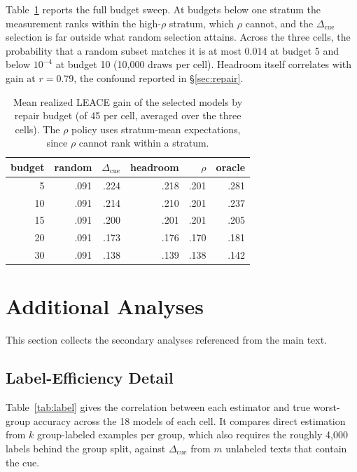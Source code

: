 \documentclass[11pt]{article}
\newcommand{\cued}{\ensuremath{\Delta_{\mathrm{cue}}}}
\begin{document}
Table~\ref{tab:sweep} reports the full budget sweep. At budgets below one
stratum the measurement ranks within the high-$\rho$ stratum, which $\rho$
cannot, and the \cued{} selection is far outside what random selection
attains. Across the three cells, the probability that a random subset matches
it is at most $0.014$ at budget 5 and below $10^{-4}$ at budget 10 (10{,}000
draws per cell). Headroom itself correlates with gain at $r{=}0.79$, the
confound reported in \S\ref{sec:repair}.

\begin{table}[t]
\centering\small
\begin{tabular}{rrrrrr}
\toprule
budget & random & \cued{} & headroom & $\rho$ & oracle \\
\midrule
 5 & .091 & .224 & .218 & .201 & .281 \\
10 & .091 & .214 & .210 & .201 & .237 \\
15 & .091 & .200 & .201 & .201 & .205 \\
20 & .091 & .173 & .176 & .170 & .181 \\
30 & .091 & .138 & .139 & .138 & .142 \\
\bottomrule
\end{tabular}
\caption{Mean realized LEACE gain of the selected models by repair budget
(of 45 per cell, averaged over the three cells). The $\rho$ policy uses
stratum-mean expectations, since $\rho$ cannot rank within a stratum.}
\label{tab:sweep}
\end{table}

\section{Additional Analyses}
\label{app:additional}
This section collects the secondary analyses referenced from the main text.

\subsection{Label-Efficiency Detail}
\label{app:label}
Table~\ref{tab:label} gives the correlation between each estimator and true
worst-group accuracy across the 18 models of each cell. It compares direct
estimation from $k$ group-labeled examples per group, which also requires the
roughly 4{,}000 labels behind the group split, against \cued{} from $m$
unlabeled texts that contain the cue.
\end{document}
